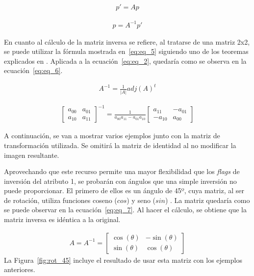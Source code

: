 \begin{align}
	p' = A  p
	\label{eq:eq_3}
\end{align}


\begin{align}
	p = A^{-1}  p'
	\label{eq:eq_4}
\end{align}

En cuanto al cálculo de la matriz inversa se refiere, al tratarse de una matriz 2x2, se puede utilizar la fórmula mostrada en~\eqref{eq:eq_5} siguiendo uno de los teoremas explicados en \cite{bib:algebra}. Aplicada a la ecuación~\eqref{eq:eq_2}, quedaría como se observa en la ecuación~\eqref{eq:eq_6}.

\begin{align}
	A^{-1} =
	\frac{1}{|A|}
	adj(A)^t
	\label{eq:eq_5}
\end{align}

\begin{align}
	\begin{bmatrix}
		a_{00} & a_{01}\\
		a_{10} & a_{11}
	\end{bmatrix}^{-1}
	=
	\frac{1}{a_{00}a_{11}-a_{01}a_{10}}
	\begin{bmatrix}
		a_{11} & -a_{01}\\
		-a_{10} & a_{00}
	\end{bmatrix}
	\label{eq:eq_6}
\end{align}

A continuación, se van a mostrar varios ejemplos junto con la matriz de transformación utilizada. Se omitirá la matriz de identidad al no modificar la imagen resultante.

Aprovechando que este recurso permite una mayor flexibilidad que los \textit{flags} de inversión del atributo 1, se probarán con ángulos que una simple inversión no puede proporcionar. El primero de ellos es un ángulo de 45º, cuya matriz, al ser de rotación, utiliza funciones coseno ($cos$) y seno ($sin$) \cite{bib:aff_matrix}. La matriz quedaría como se puede observar en la ecuación~\eqref{eq:eq_7}. Al hacer el cálculo, se obtiene que la matriz inversa es idéntica a la original.

\begin{align}
	A
	=
	A^{-1}
	=
	\begin{bmatrix}
		\cos(\theta) & -\sin(\theta)\\
		\sin(\theta) & \cos(\theta)
	\end{bmatrix}
	\label{eq:eq_7}
\end{align}
\newpage
La Figura~\ref{fig:rot_45} incluye el resultado de usar esta matriz con los ejemplos anteriores.

